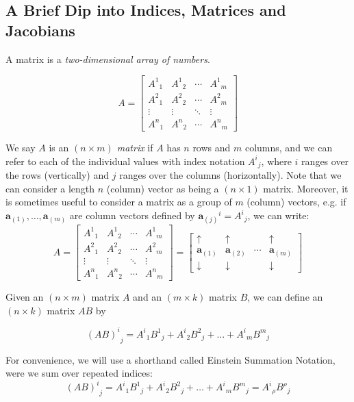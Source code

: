 \documentclass[a4paper]{article}
\theoremstyle{plain} %
\theoremstyle{definition} %
\numberwithin{equation}{subsection}
\begin{document}
\subsection{A Brief Dip into Indices, Matrices and Jacobians}

A matrix is a \emph{two-dimensional array of numbers}. 

\[
A = \begin{bmatrix}
{A^1}_1 & {A^1}_2 & \cdots & {A^1}_m \\
{A^2}_1 & {A^2}_2 & \cdots & {A^2}_m \\
\vdots & \vdots & \ddots & \vdots \\
{A^n}_1 & {A^n}_2 & \cdots & {A^n}_m
\end{bmatrix}
\]

We say $A$ is an  \emph{$(n \times m)$ matrix} if $A$ has $n$ rows and $m$ columns, and we can refer to each of the individual values with index notation ${A^i}_{j}$, where $i$ ranges over the rows (vertically) and $j$ ranges over the columns (horizontally). 
Note that we can consider a length $n$ (column) vector as being a $(n \times 1)$ matrix. Moreover, it is sometimes useful to consider a matrix as a group of 
$m$ (column) vectors, e.g. if $\textbf{a}_{(1)}, \dots, \textbf{a}_{(m)}$ are column vectors defined by 
${\textbf{a}_{(j)}}^i = {A^i}_j$, we can write:
\[
A = \begin{bmatrix}
{A^1}_1 & {A^1}_2 & \cdots & {A^1}_m \\
{A^2}_1 & {A^2}_2 & \cdots & {A^2}_m \\
\vdots & \vdots & \ddots & \vdots \\
{A^n}_1 & {A^n}_2 & \cdots & {A^n}_m
\end{bmatrix} = \begin{bmatrix}
\uparrow & \uparrow &  & \uparrow \\
{\textbf{a}_{(1)}} & {\textbf{a}_{(2)}} & \cdots & {\textbf{a}_{(m)}} \\
\downarrow & \downarrow &  & \downarrow
\end{bmatrix} 
\]

Given an $(n\times m)$ matrix $A$ and an $(m \times k)$ matrix $B$, we can define an $(n \times k)$ matrix $AB$ by 

\[ 
{(AB)^i}_j = {A^i}_1{B^1}_j + {A^i}_2{B^2}_j + \dots  + {A^i}_m{B^m}_j
\]

For convenience, we will use a shorthand called Einstein Summation Notation, were we sum over repeated indices:
\[ 
{(AB)^i}_j = {A^i}_1{B^1}_j + {A^i}_2{B^2}_j + \dots  + {A^i}_m{B^m}_j = {A^i}_\rho{B^\rho}_j
\]
\end{document}
